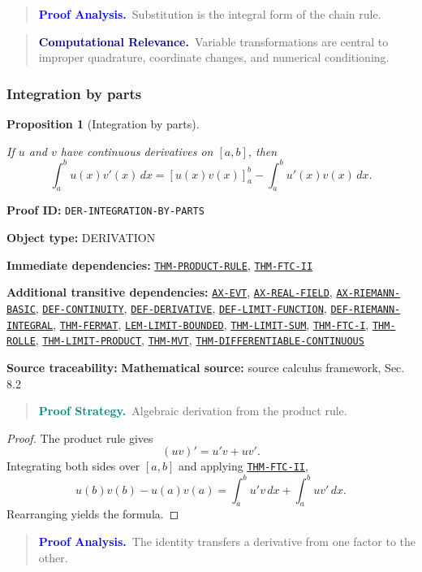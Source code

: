\documentclass[10pt]{article}
\newcommand{\pidraw}[1]{\begingroup\urlstyle{tt}\nolinkurl{#1}\endgroup}
\newcommand{\pidref}[1]{\hyperref[prf:#1]{\pidraw{#1}}}
\newcommand{\pid}[1]{\pidref{#1}}
\newtheorem{proposition}[theorem]{Proposition}
\theoremstyle{definition}
\theoremstyle{remark}
\newenvironment{proofstrategy}
{\begin{quote}\small\noindent\textbf{\textcolor{teal}{Proof Strategy.}}\ }
{\end{quote}}
\newenvironment{proofanalysis}
{\begin{quote}\small\noindent\textbf{\textcolor{blue}{Proof Analysis.}}\ }
{\end{quote}}
\newenvironment{computationalrelevance}
{\begin{quote}\small\noindent\textbf{\textcolor{navy}{Computational Relevance.}}\ }
{\end{quote}}
\newcommand{\meta}[2]{\noindent\textbf{#1:} #2\par}
\begin{document}
\begin{proofanalysis}Substitution is the integral form of the chain rule.\end{proofanalysis}

\begin{computationalrelevance}Variable transformations are central to improper quadrature, coordinate changes, and numerical conditioning.\end{computationalrelevance}

\subsubsection{Integration by parts}

\begin{proposition}[Integration by parts]\label{prf:DER-INTEGRATION-BY-PARTS}

If $u$ and $v$ have continuous derivatives on $[a,b]$, then
\[
\int_a^b u(x)v'(x)\,dx
=
[u(x)v(x)]_a^b-\int_a^b u'(x)v(x)\,dx.
\]

\end{proposition}

\meta{Proof ID}{\pidraw{DER-INTEGRATION-BY-PARTS}}
\meta{Object type}{DERIVATION}
\meta{Immediate dependencies}{\pidref{THM-PRODUCT-RULE}, \pidref{THM-FTC-II}}
\meta{Additional transitive dependencies}{\pidref{AX-EVT}, \pidref{AX-REAL-FIELD}, \pidref{AX-RIEMANN-BASIC}, \pidref{DEF-CONTINUITY}, \pidref{DEF-DERIVATIVE}, \pidref{DEF-LIMIT-FUNCTION}, \pidref{DEF-RIEMANN-INTEGRAL}, \pidref{THM-FERMAT}, \pidref{LEM-LIMIT-BOUNDED}, \pidref{THM-LIMIT-SUM}, \pidref{THM-FTC-I}, \pidref{THM-ROLLE}, \pidref{THM-LIMIT-PRODUCT}, \pidref{THM-MVT}, \pidref{THM-DIFFERENTIABLE-CONTINUOUS}}
\meta{Source traceability}{\textbf{Mathematical source:} source calculus framework, Sec. 8.2}

\begin{proofstrategy}Algebraic derivation from the product rule.\end{proofstrategy}

\begin{proof}

The product rule gives
\[
(uv)'=u'v+uv'.
\]
Integrating both sides over $[a,b]$ and applying \pid{THM-FTC-II},
\[
u(b)v(b)-u(a)v(a)
=
\int_a^b u'v\,dx+\int_a^b uv'\,dx.
\]
Rearranging yields the formula.

\end{proof}

\begin{proofanalysis}The identity transfers a derivative from one factor to the other.\end{proofanalysis}
\end{document}
